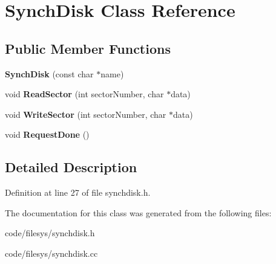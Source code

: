 \section{Synch\+Disk Class Reference}
\label{class_synch_disk}
\subsection*{Public Member Functions}
\begin{DoxyCompactItemize}
\item 
{\bfseries Synch\+Disk} (const char $\ast$name)\label{class_synch_disk_aa6cc1815e0aca2d6fe11d426942e6538}

\item 
void {\bfseries Read\+Sector} (int sector\+Number, char $\ast$data)\label{class_synch_disk_a7d8195bd5d464e4771946eb03c61e8c8}

\item 
void {\bfseries Write\+Sector} (int sector\+Number, char $\ast$data)\label{class_synch_disk_aadb7e2ce6cf32727e493c63c5ea1018b}

\item 
void {\bfseries Request\+Done} ()\label{class_synch_disk_a973a65b7b7b92f5fabf18da8b8bae402}

\end{DoxyCompactItemize}


\subsection{Detailed Description}


Definition at line 27 of file synchdisk.\+h.



The documentation for this class was generated from the following files\+:\begin{DoxyCompactItemize}
\item 
code/filesys/synchdisk.\+h\item 
code/filesys/synchdisk.\+cc\end{DoxyCompactItemize}
